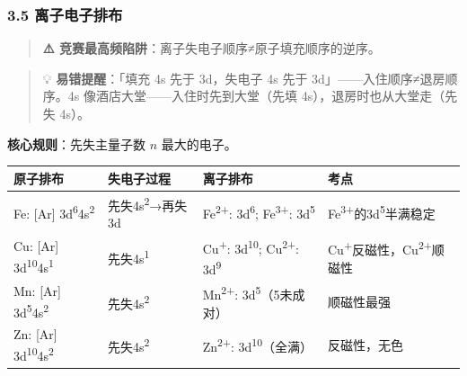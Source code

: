 \documentclass[a4paper,11pt]{ctexart}
\newcounter{none}
\begin{document}
\subsubsection{3.5 离子电子排布}\label{ux79bbux5b50ux7535ux5b50ux6392ux5e03}

\begin{quote}
\textbf{⚠️ 竞赛最高频陷阱}：离子失电子顺序≠原子填充顺序的逆序。
\end{quote}

\begin{quote}
💡 \textbf{易错提醒}：「填充 4s 先于 3d，失电子 4s 先于 3d」------入住顺序≠退房顺序。4s 像酒店大堂------入住时先到大堂（先填 4s），退房时也从大堂走（先失 4s）。
\end{quote}

\textbf{核心规则}：先失主量子数 \(n\) 最大的电子。

{\def\LTcaptype{none} %
\begin{longtable}[]{@{}
  >{\raggedright\arraybackslash}p{}
  >{\raggedright\arraybackslash}p{}
  >{\raggedright\arraybackslash}p{}
  >{\raggedright\arraybackslash}p{}@{}}
\toprule\noalign{}
\begin{minipage}[b]{\linewidth}\raggedright
原子排布
\end{minipage} & \begin{minipage}[b]{\linewidth}\raggedright
失电子过程
\end{minipage} & \begin{minipage}[b]{\linewidth}\raggedright
离子排布
\end{minipage} & \begin{minipage}[b]{\linewidth}\raggedright
考点
\end{minipage} \\
\midrule\noalign{}
\endhead
\bottomrule\noalign{}
\endlastfoot
Fe: {[}Ar{]} 3d\textsuperscript{6}4s\textsuperscript{2} & 先失4s\textsuperscript{2}→再失3d & Fe\textsuperscript{2+}: 3d\textsuperscript{6}; Fe\textsuperscript{3+}: 3d\textsuperscript{5} & Fe\textsuperscript{3+}的3d\textsuperscript{5}半满稳定 \\
Cu: {[}Ar{]} 3d\textsuperscript{10}4s\textsuperscript{1} & 先失4s\textsuperscript{1} & Cu\textsuperscript{+}: 3d\textsuperscript{10}; Cu\textsuperscript{2+}: 3d\textsuperscript{9} & Cu\textsuperscript{+}反磁性，Cu\textsuperscript{2+}顺磁性 \\
Mn: {[}Ar{]} 3d\textsuperscript{5}4s\textsuperscript{2} & 先失4s\textsuperscript{2} & Mn\textsuperscript{2+}: 3d\textsuperscript{5}（5未成对） & 顺磁性最强 \\
Zn: {[}Ar{]} 3d\textsuperscript{10}4s\textsuperscript{2} & 先失4s\textsuperscript{2} & Zn\textsuperscript{2+}: 3d\textsuperscript{10}（全满） & 反磁性，无色 \\
\end{longtable}
}
\end{document}
